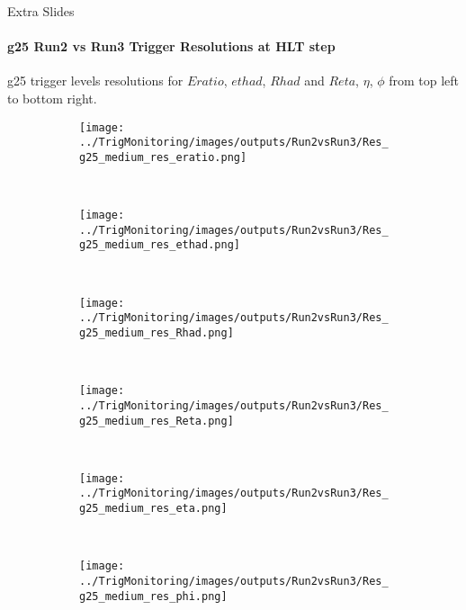 \documentclass[aspectratio=1610,8pt]{beamer}					%
\begin{document}
\begin{frame}{Extra Slides}
\framesubtitle{g25 Run2 vs Run3 Trigger Resolutions at HLT step}
    g25 trigger levels resolutions for $Eratio$, $ethad$, $Rhad$ and $Reta$, $\eta$, $\phi$ from top left to bottom right.
    \begin{figure}[h!]
        \centering
        \begin{subfigure}[b]{.3\textwidth}
            \centering
            \texttt{[image: ../TrigMonitoring/images/outputs/Run2vsRun3/Res\_g25\_medium\_res\_eratio.png]}
            \caption{~}
        \end{subfigure}
        \begin{subfigure}[b]{.3\textwidth}
            \centering
            \texttt{[image: ../TrigMonitoring/images/outputs/Run2vsRun3/Res\_g25\_medium\_res\_ethad.png]}
            \caption{~}
        \end{subfigure}
        \begin{subfigure}[b]{.3\textwidth}
            \centering
            \texttt{[image: ../TrigMonitoring/images/outputs/Run2vsRun3/Res\_g25\_medium\_res\_Rhad.png]}
            \caption{~}
        \end{subfigure}
        \begin{subfigure}[b]{.3\textwidth}
            \centering
            \texttt{[image: ../TrigMonitoring/images/outputs/Run2vsRun3/Res\_g25\_medium\_res\_Reta.png]}
            \caption{~}
        \end{subfigure}
        \begin{subfigure}[b]{.3\textwidth}
            \centering
            \texttt{[image: ../TrigMonitoring/images/outputs/Run2vsRun3/Res\_g25\_medium\_res\_eta.png]}
            \caption{~}
        \end{subfigure}
        \begin{subfigure}[b]{.3\textwidth}
            \centering
            \texttt{[image: ../TrigMonitoring/images/outputs/Run2vsRun3/Res\_g25\_medium\_res\_phi.png]}
            \caption{~}
        \end{subfigure}
    \end{figure}
\end{frame}
\end{document}
